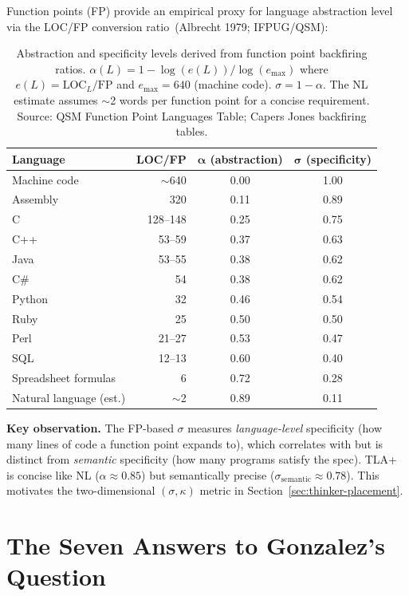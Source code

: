 \documentclass[11pt, a4paper, copyright]{googledeepmind}
\begin{document}
Function points (FP) provide an empirical proxy for language abstraction level via the LOC/FP conversion ratio~(Albrecht 1979; IFPUG/QSM):

\begin{table}[H]
\centering
\small
\begin{tabular}{lrcc}
\toprule
\textbf{Language} & \textbf{LOC/FP} & $\boldsymbol{\alpha}$ \textbf{(abstraction)} & $\boldsymbol{\sigma}$ \textbf{(specificity)} \\
\midrule
Machine code & $\sim$640 & 0.00 & 1.00 \\
Assembly & 320 & 0.11 & 0.89 \\
C & 128--148 & 0.25 & 0.75 \\
C++ & 53--59 & 0.37 & 0.63 \\
Java & 53--55 & 0.38 & 0.62 \\
C\# & 54 & 0.38 & 0.62 \\
Python & 32 & 0.46 & 0.54 \\
Ruby & 25 & 0.50 & 0.50 \\
Perl & 21--27 & 0.53 & 0.47 \\
SQL & 12--13 & 0.60 & 0.40 \\
Spreadsheet formulas & 6 & 0.72 & 0.28 \\
Natural language (est.) & $\sim$2 & 0.89 & 0.11 \\
\bottomrule
\end{tabular}
\caption{Abstraction and specificity levels derived from function point backfiring ratios. $\alpha(L) = 1 - \log(e(L)) / \log(e_{\max})$ where $e(L) = \text{LOC}_L / \text{FP}$ and $e_{\max} = 640$ (machine code). $\sigma = 1 - \alpha$. The NL estimate assumes $\sim$2 words per function point for a concise requirement. Source: QSM Function Point Languages Table; Capers Jones backfiring tables.}
\label{tab:fp-ratios}
\end{table}

\textbf{Key observation.} The FP-based $\sigma$ measures \emph{language-level} specificity (how many lines of code a function point expands to), which correlates with but is distinct from \emph{semantic} specificity (how many programs satisfy the spec). TLA+ is concise like NL ($\alpha \approx 0.85$) but semantically precise ($\sigma_{\text{semantic}} \approx 0.78$). This motivates the two-dimensional $(\sigma, \kappa)$ metric in Section~\ref{sec:thinker-placement}.


\section{The Seven Answers to Gonzalez's Question}
\label{app:seven-answers}
\end{document}
